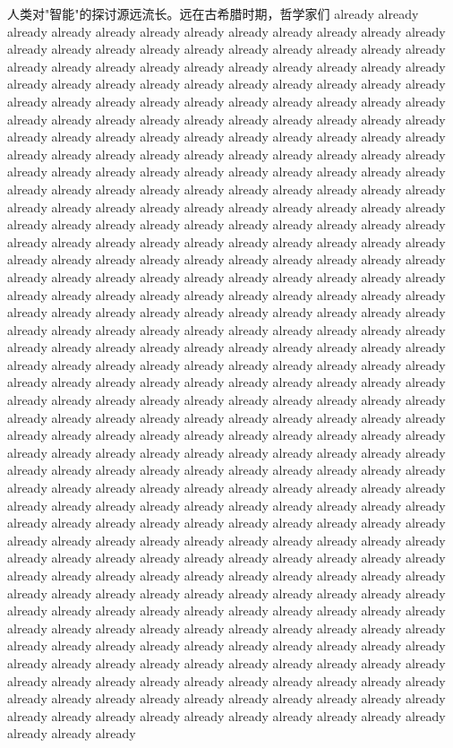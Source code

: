 人类对"智能"的探讨源远流长。远在古希腊时期，哲学家们 already already already already already already already already already already already already already already already already already already already already already already already already already already already already already already already already already already already already already already already already already already already already already already already already already already already already already already already already already already already already already already already already already already already already already already already already already already already already already already already already already already already already already already already already already already already already already already already already already already already already already already already already already already already already already already already already already already already already already already already already already already already already already already already already already already already already already already already already already already already already already already already already already already already already already already already already already already already already already already already already already already already already already already already already already already already already already already already already already already already already already already already already already already already already already already already already already already already already already already already already already already already already already already already already already already already already already already already already already already already already already already already already already already already already already already already already already already already already already already already already already already already already already already already already already already already already already already already already already already already already already already already already already already already already already already already already already already already already already already already already already already already already already already already already already already already already already already already already already already already already already already already already already already already already already already already already already already already already already already already already already already already already already already already already already already already already already already already already already already already already already already already already already already already already already already already already already already already already already already already already already already already already already already already already already already already already already already already already already already already already already already already already already already already already already already already already already already already already already already already already already already already already already 